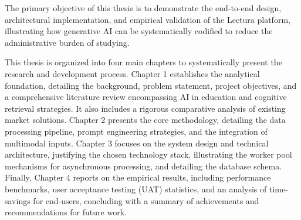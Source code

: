 The primary objective of this thesis is to demonstrate the end-to-end design, architectural implementation, and empirical validation of the Lectura platform, illustrating how generative AI can be systematically codified to reduce the administrative burden of studying.

This thesis is organized into four main chapters to systematically present the research and development process. Chapter 1 establishes the analytical foundation, detailing the background, problem statement, project objectives, and a comprehensive literature review encompassing AI in education and cognitive retrieval strategies. It also includes a rigorous comparative analysis of existing market solutions. Chapter 2 presents the core methodology, detailing the data processing pipeline, prompt engineering strategies, and the integration of multimodal inputs. Chapter 3 focuses on the system design and technical architecture, justifying the chosen technology stack, illustrating the worker pool mechanisms for asynchronous processing, and detailing the database schema. Finally, Chapter 4 reports on the empirical results, including performance benchmarks, user acceptance testing (UAT) statistics, and an analysis of time-savings for end-users, concluding with a summary of achievements and recommendations for future work.